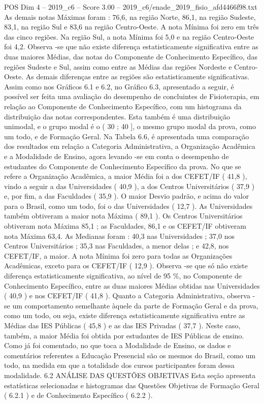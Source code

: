\begin{textsample}{POS Dim 4 – 2019\_c6 – Score 3.00 – 2019\_c6/enade\_2019\_fisio\_afd4466f98.txt}
As demais notas Máximas foram : 76,6, na região Norte, 86,1, na região Sudeste, 83,1, na região Sul e 83,6 na região Centro-Oeste.
A nota Mínima foi zero em três das cinco regiões.
Na região Sul, a nota Mínima foi 5,0 e na região Centro-Oeste foi 4,2.
Observa -se que não existe diferença estatisticamente significativa entre as duas maiores Médias, das notas do Componente de Conhecimento Específico, das regiões Sudeste e Sul, assim como entre as Médias das regiões Nordeste e Centro-Oeste.
As demais diferenças entre as regiões são estatisticamente significativas.
Assim como nos Gráficos 6.1 e 6.2, no Gráfico 6.3, apresentado a seguir, é possível ser feita uma avaliação do desempenho de concluintes de Fisioterapia, em relação ao Componente de Conhecimento Específico, com um histograma da distribuição das notas correspondentes.
Esta também é uma distribuição unimodal, e o grupo modal é o ( 30 ; 40 ], o mesmo grupo modal da prova, como um todo, e de Formação Geral.
Na Tabela 6.6, é apresentada uma comparação dos resultados em relação a Categoria Administrativa, a Organização Acadêmica e a Modalidade de Ensino, agora levando -se em conta o desempenho de estudantes do Componente de Conhecimento Específico da prova.
No que se refere a Organização Acadêmica, a maior Média foi a dos CEFET/IF ( 41,8 ), vindo a seguir a das Universidades ( 40,9 ), a dos Centros Universitários ( 37,9 ) e, por fim, a das Faculdades ( 35,9 ).
O maior Desvio padrão, e acima do valor para o Brasil, como um todo, foi o das Universidades ( 12,7 ).
As Universidades também obtiveram a maior nota Máxima ( 89,1 ).
Os Centros Universitários obtiveram nota Máxima 85,1 ; as Faculdades, 86,1 e os CEFET/IF obtiveram nota Máxima 63,4.
As Medianas foram : 40,3 nas Universidades ; 37,0 nos Centros Universitários ; 35,3 nas Faculdades, a menor delas ; e 42,8, nos CEFET/IF, a maior.
A nota Mínima foi zero para todas as Organizações Acadêmicas, exceto para os CEFET/IF ( 12,9 ).
Observa -se que só não existe diferença estatisticamente significativa, ao nível de 95 \%, no Componente de Conhecimento Específico, entre as duas maiores Médias obtidas nas Universidades ( 40,9 ) e nos CEFET/IF ( 41,8 ).
Quanto a Categoria Administrativa, observa -se um comportamento semelhante àquele da parte de Formação Geral e da prova, como um todo, ou seja, existe diferença estatisticamente significativa entre as Médias das IES Públicas ( 45,8 ) e as das IES Privadas ( 37,7 ).
Neste caso, também, a maior Média foi obtida por estudantes de IES Públicas de ensino.
Como já foi comentado, no que toca a Modalidade de Ensino, os dados e comentários referentes a Educação Presencial são os mesmos do Brasil, como um todo, na medida em que a totalidade dos cursos participantes foram dessa modalidade. 6.2 ANÁLISE DAS QUESTÕES OBJETIVAS Esta seção apresenta estatísticas selecionadas e histogramas das Questões Objetivas de Formação Geral ( 6.2.1 ) e de Conhecimento Específico ( 6.2.2 ).

\end{textsample}
